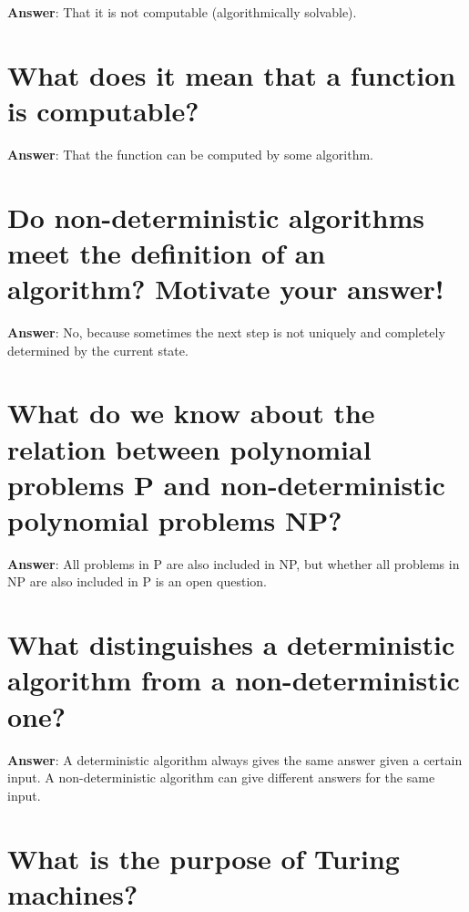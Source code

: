 \documentclass[a4paper,11pt,oneside]{book}
\begin{document}
\begin{sloppypar}
\textbf{Answer}: That it is not computable (algorithmically solvable).



\section{What does it mean that a function is computable?}

\label{q:341:sa:en:True}

\textbf{Answer}: That the function can be computed by some algorithm.



\section{Do non-deterministic algorithms meet the definition of an algorithm? Motivate your answer!}

\label{q:342:sa:en:True}

\textbf{Answer}: No, because sometimes the next step is not uniquely and completely determined by the current state.



\section{What do we know about the relation between polynomial problems P and non-deterministic polynomial problems NP?}

\label{q:343:sa:en:True}

\textbf{Answer}: All problems in P are also included in NP, but whether all problems in NP are also included in P is an open question.



\section{What distinguishes a deterministic algorithm from a non-deterministic one?}

\label{q:344:sa:en:True}

\textbf{Answer}: A deterministic algorithm always gives the same answer given a certain input. A non-deterministic algorithm can give different answers for the same input.



\section{What is the purpose of Turing machines?}


\end{sloppypar}
\end{document}
